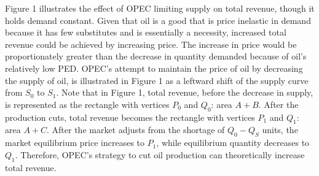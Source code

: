 \documentclass[12pt]{article}
\begin{document}
\begin{center}

\end{center}



Figure 1 illustrates the effect of OPEC limiting supply on total revenue, though it holds demand constant. Given that oil is a good that is price inelastic in demand because it has few substitutes and is essentially a necessity, increased total revenue could be achieved by increasing price. The increase in price would be proportionately greater than the decrease in quantity demanded because of oil's relatively low  PED. OPEC’s attempt to maintain the price of oil by decreasing the supply of oil, is illustrated in Figure 1 as a leftward shift of the supply curve from  $S_0$ to $S_1$. Note that in Figure 1, total revenue, before the decrease in supply, is represented as the rectangle with vertices $P_0$ and $Q_0$: area  $A + B$. After the production cuts, total revenue becomes the rectangle with vertices $P_1$ and $Q_1$: area $A + C$. After the market adjusts from the shortage of  $Q_0 - Q_S$  units, the market equilibrium price increases to $P_1$, while equilibrium quantity decreases to  $Q_1$. Therefore, OPEC's strategy to cut oil production can theoretically increase total revenue.


\newpage


\end{document}
